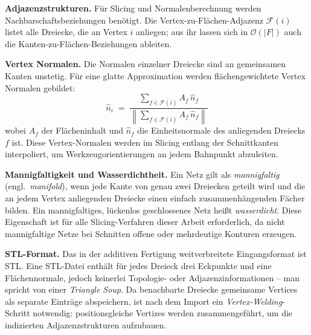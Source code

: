         \textbf{Adjazenzstrukturen.}
        Für Slicing und Normalenberechnung werden Nachbarschaftsbeziehungen benötigt.
        Die Vertex-zu-Flächen-Adjazenz $\mathcal{F}(i)$ listet alle Dreiecke, die an Vertex $i$ anliegen;
        aus ihr lassen sich in $\mathcal{O}(|F|)$ auch die Kanten-zu-Flächen-Beziehungen ableiten.

        \textbf{Vertex Normalen.}
        Die Normalen einzelner Dreiecke sind an gemeinsamen Kanten unstetig.
        Für eine glatte Approximation werden flächengewichtete Vertex Normalen gebildet:
        \begin{equation}
            \hat{n}_i
            \;=\;
            \frac{\displaystyle\sum_{f \in \mathcal{F}(i)} A_f \,\hat{n}_f}
                 {\displaystyle\left\|\sum_{f \in \mathcal{F}(i)} A_f \,\hat{n}_f\right\|}
            \label{eq:vertex-normal}
        \end{equation}
        wobei $A_f$ der Flächeninhalt und $\hat{n}_f$ die Einheitsnormale des anliegenden Dreiecks $f$ ist.
        Diese Vertex-Normalen werden im Slicing entlang der Schnittkanten interpoliert,
        um Werkzeugorientierungen an jedem Bahnpunkt abzuleiten.

        \textbf{Mannigfaltigkeit und Wasserdichtheit.}
        Ein Netz gilt als \emph{mannigfaltig} (engl.\ \emph{manifold}),
        wenn jede Kante von genau zwei Dreiecken geteilt wird
        und die an jedem Vertex anliegenden Dreiecke einen einfach zusammenhängenden Fächer bilden.
        Ein mannigfaltiges, lückenlos geschlossenes Netz heißt \emph{wasserdicht}.
        Diese Eigenschaft ist für alle Slicing-Verfahren dieser Arbeit erforderlich,
        da nicht mannigfaltige Netze bei Schnitten offene oder mehrdeutige Konturen erzeugen.

        \textbf{\ac{STL}-Format.}
        Das in der additiven Fertigung weitverbreitete Eingangsformat ist \ac{STL}.
        Eine \ac{STL}-Datei enthält für jedes Dreieck drei Eckpunkte und eine Flächennormale,
        jedoch keinerlei Topologie- oder Adjazenzinformationen -- man spricht von einer \emph{Triangle Soup}.
        Da benachbarte Dreiecke gemeinsame Vertices als separate Einträge abspeichern,
        ist nach dem Import ein \emph{Vertex-Welding}-Schritt notwendig:
        positionsgleiche Vertizes werden zusammengeführt, um die indizierten Adjazenzstrukturen aufzubauen.
        \cite{lettoriReviewGeometryRepresentation2022}
        \cite{gregoriSlicingTriangleMeshes2014}

